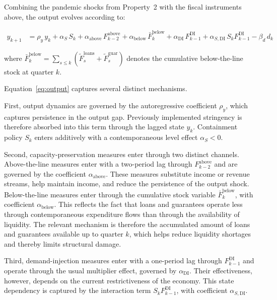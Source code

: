 \documentclass[12pt, a4paper]{article}
\begin{document}
Combining the pandemic shocks from Property~2 with the fiscal instruments above, the output evolves according to:

\begin{equation}\label{eq:output}
\begin{aligned}
      y_{k+1} &= \rho_y\, y_k + \alpha_S\, S_k
          + \alpha_{\text{above}}\, F^{\text{above}}_{k-2}
          + \alpha_{\text{below}}\, \bar F^{\text{below}}_k
          + \alpha_{\text{DI}}\, F^{\text{DI}}_{k-1}
          + \alpha_{S,\text{DI}}\, S_k F^{\text{DI}}_{k-1}
          - \beta_d\, d_k 
\end{aligned}
\end{equation}

\noindent where $\bar F^{\text{below}}_k = \sum_{s \leq k}(\tilde F^{\text{loans}}_s + \tilde F^{\text{guar}}_s)$ denotes the cumulative below-the-line stock at quarter $k$.

\noindent Equation~\eqref{eq:output} captures several distinct mechanisms. 

First, output dynamics are governed by the autoregressive coefficient $\rho_y$, which captures persistence in the output gap. Previously implemented stringency is therefore absorbed into this term through the lagged state $y_k$. Containment policy $S_k$ enters additively with a contemporaneous level effect $\alpha_S < 0$.

Second, capacity-preservation measures enter through two distinct channels. Above-the-line measures enter with a two-period lag through $F^{\text{above}}_{k-2}$ and are governed by the coefficient $\alpha_{\text{above}}$. These measures substitute income or revenue streams, help maintain income, and reduce the persistence of the output shock. Below-the-line measures enter through the cumulative stock variable $\bar F^{\text{below}}_k$, with coefficient $\alpha_{\text{below}}$. This reflects the fact that loans and guarantees operate less through contemporaneous expenditure flows than through the availability of liquidity. The relevant mechanism is therefore the accumulated amount of loans and guarantees available up to quarter $k$, which helps reduce liquidity shortages and thereby limits structural damage.

Third, demand-injection measures enter with a one-period lag through $F^{\text{DI}}_{k-1}$ and operate through the usual multiplier effect, governed by $\alpha_{\text{DI}}$. Their effectiveness, however, depends on the current restrictiveness of the economy. This state dependency is captured by the interaction term $S_k F^{\text{DI}}_{k-1}$, with coefficient $\alpha_{S,\text{DI}}$.
\end{document}
